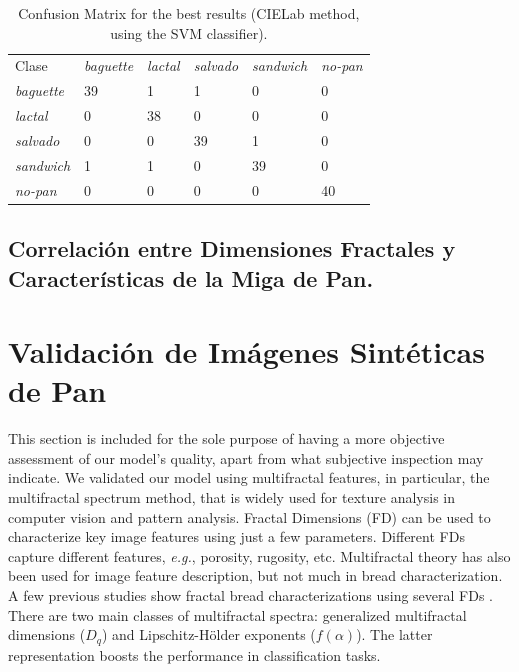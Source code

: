 \documentclass[spanish,a4paper,openright,11pt]{book}
\begin{document}
\begin{table}[h!]
\caption{Confusion Matrix for the best results (CIELab method, using the SVM classifier).}
\label{tab:confusionmatrix}       %
\begin{tabular}{llllll}
\hline\noalign{\smallskip}
Clase&{\em baguette} & {\em lactal} & {\em salvado} &{\em sandwich}&{\em no-pan} \\
\noalign{\smallskip}\hline\noalign{\smallskip}
{\em baguette} & 39& 1 &1 &0 &0 \\
{\em lactal} & 0& 38 &0 &0 &0  \\
{\em salvado} & 0& 0 &39 &1 &0  \\
{\em sandwich} & 1& 1 &0 &39 &0  \\
{\em no-pan} & 0& 0 &0 &0 &40  \\
\hline
\end{tabular}
\end{table}


\subsection{Correlación entre Dimensiones Fractales y Características de la Miga de Pan.}

\section{Validación de Imágenes Sintéticas de Pan}

This section is included for the sole purpose of having a more objective assessment of our model's quality, apart from what subjective inspection may indicate. 
We validated our model using multifractal features, in particular, the multifractal spectrum method, that is widely used for texture analysis in computer vision and pattern analysis.
Fractal Dimensions (FD) can be used to characterize key image features using just a few parameters. 
Different FDs capture different features, {\em e.g.}, porosity, rugosity, etc.
Multifractal theory has also been used for image feature description, but not much in bread characterization. 
A few previous studies show fractal bread characterizations using several FDs \cite{Gonzales2008,Baravalle2012}. 
There are two main classes of multifractal spectra: generalized multifractal dimensions ($D_{q}$) and Lipschitz-H\"older exponents ($f(\alpha)$). 
The latter representation boosts the performance in classification tasks.
\end{document}

